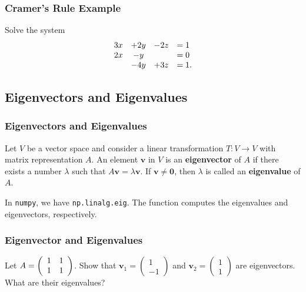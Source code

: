 \documentclass{beamer}
\begin{document}
\begin{frame}[t]
\frametitle{Cramer's Rule Example}
\small
\begin{Example}
Solve the system 
$$
\begin{array}{r c c l}
3x 	&+ 2y 	&- 2z 	&= 1\\
2x 	&- y		&		&= 0\\
	&-4y 		&+ 3z	&= 1.
\end{array} 		
$$
\end{Example}


\end{frame}



\subsection{Eigenvectors and Eigenvalues}

\begin{frame}
\frametitle{Eigenvectors and Eigenvalues}
\begin{Definition}
Let $V$ be a vector space and consider a linear transformation $T:V\to V$ with matrix representation $A$. An element ${\boldsymbol v}$ in $V$ is an {\bf eigenvector} of $A$ if there exists a number $\lambda$ such that $A{\boldsymbol v} = \lambda {\boldsymbol v}$. If ${\boldsymbol v}\neq {\boldsymbol 0}$, then $\lambda$ is called an {\bf eigenvalue} of $A$.
\end{Definition}
In \texttt{numpy}, we have \texttt{np.linalg.eig}. The function computes the eigenvalues and eigenvectors, respectively.
\end{frame}

\begin{frame}[t]
\frametitle{Eigenvector and Eigenvalues}
\begin{Example}
{\small
Let $A = \left(\begin{array}{c c} 1	&	1\\	1	&	1\end{array}\right)$. Show that ${\boldsymbol v_1} = \left(\begin{array}{c} 1\\	-1\end{array}\right)$ and ${\boldsymbol v_2} = \left(\begin{array}{c} 1\\ 1\end{array}\right)$ are eigenvectors. What are their eigenvalues?
}
\end{Example}

\end{frame}
\end{document}
